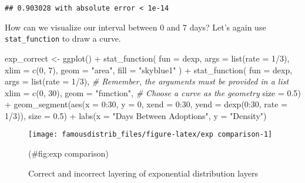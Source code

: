 \documentclass[
]{article}
\newenvironment{Shaded}{\begin{snugshade}}{\end{snugshade}}
\newcommand{\AttributeTok}[1]{\textcolor[rgb]{0.77,0.63,0.00}{#1}}
\newcommand{\CommentTok}[1]{\textcolor[rgb]{0.56,0.35,0.01}{\textit{#1}}}
\newcommand{\DecValTok}[1]{\textcolor[rgb]{0.00,0.00,0.81}{#1}}
\newcommand{\FloatTok}[1]{\textcolor[rgb]{0.00,0.00,0.81}{#1}}
\newcommand{\FunctionTok}[1]{\textcolor[rgb]{0.00,0.00,0.00}{#1}}
\newcommand{\NormalTok}[1]{#1}
\newcommand{\OtherTok}[1]{\textcolor[rgb]{0.56,0.35,0.01}{#1}}
\newcommand{\SpecialCharTok}[1]{\textcolor[rgb]{0.00,0.00,0.00}{#1}}
\newcommand{\StringTok}[1]{\textcolor[rgb]{0.31,0.60,0.02}{#1}}
\begin{document}
\begin{verbatim}
## 0.903028 with absolute error < 1e-14
\end{verbatim}

How can we visualize our interval between 0 and 7 days? Let's again use \texttt{stat\_function} to draw a curve.

\begin{Shaded}
\begin{Highlighting}[]
\NormalTok{exp\_correct }\OtherTok{\textless{}{-}} \FunctionTok{ggplot}\NormalTok{() }\SpecialCharTok{+}
  \FunctionTok{stat\_function}\NormalTok{(}
    \AttributeTok{fun =}\NormalTok{ dexp,}
    \AttributeTok{args =} \FunctionTok{list}\NormalTok{(}\AttributeTok{rate =} \DecValTok{1}\SpecialCharTok{/}\DecValTok{3}\NormalTok{),}
    \AttributeTok{xlim =} \FunctionTok{c}\NormalTok{(}\DecValTok{0}\NormalTok{, }\DecValTok{7}\NormalTok{),}
    \AttributeTok{geom =} \StringTok{"area"}\NormalTok{,}
    \AttributeTok{fill =} \StringTok{"skyblue1"}
\NormalTok{  ) }\SpecialCharTok{+}
  \FunctionTok{stat\_function}\NormalTok{(}
    \AttributeTok{fun =}\NormalTok{ dexp,}
    \AttributeTok{args =} \FunctionTok{list}\NormalTok{(}\AttributeTok{rate =} \DecValTok{1}\SpecialCharTok{/}\DecValTok{3}\NormalTok{), }\CommentTok{\# Remember, the arguments must be provided in a list}
    \AttributeTok{xlim =} \FunctionTok{c}\NormalTok{(}\DecValTok{0}\NormalTok{, }\DecValTok{30}\NormalTok{),}
    \AttributeTok{geom =} \StringTok{"function"}\NormalTok{, }\CommentTok{\# Choose a curve as the geometry}
    \AttributeTok{size =} \FloatTok{0.5}\NormalTok{) }\SpecialCharTok{+}
  \FunctionTok{geom\_segment}\NormalTok{(}\FunctionTok{aes}\NormalTok{(}\AttributeTok{x =} \DecValTok{0}\SpecialCharTok{:}\DecValTok{30}\NormalTok{, }\AttributeTok{y =} \DecValTok{0}\NormalTok{, }\AttributeTok{xend =} \DecValTok{0}\SpecialCharTok{:}\DecValTok{30}\NormalTok{, }\AttributeTok{yend =} \FunctionTok{dexp}\NormalTok{(}\DecValTok{0}\SpecialCharTok{:}\DecValTok{30}\NormalTok{, }\AttributeTok{rate =} \DecValTok{1}\SpecialCharTok{/}\DecValTok{3}\NormalTok{)), }\AttributeTok{size =} \FloatTok{0.5}\NormalTok{) }\SpecialCharTok{+}
  \FunctionTok{labs}\NormalTok{(}\AttributeTok{x =} \StringTok{"Days Between Adoptions"}\NormalTok{, }\AttributeTok{y =} \StringTok{"Density"}\NormalTok{)}
\end{Highlighting}
\end{Shaded}

\begin{figure}

{\centering \texttt{[image: famousdistrib\_files/figure-latex/exp comparison-1]} 

}

\caption{Correct and incorrect layering of exponential distribution layers}(\#fig:exp comparison)
\end{figure}
\end{document}
